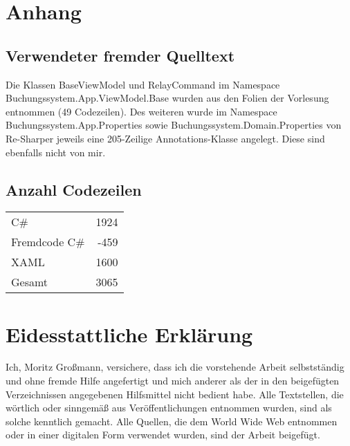 \section{Anhang}

\subsection{Verwendeter fremder Quelltext}

Die Klassen BaseViewModel und RelayCommand im Namespace Buchungssystem.App.ViewModel.Base wurden aus den Folien der Vorlesung entnommen (49 Codezeilen).
Des weiteren wurde im Namespace Buchungssystem.App.Properties sowie Buchungssystem.Domain.Properties von Re-Sharper jeweils eine 205-Zeilige Annotations-Klasse angelegt. 
Diese sind ebenfalls nicht von mir. 

\subsection{Anzahl Codezeilen}

\begin{tabular} {lr}
    C\# & 1924 \\
    Fremdcode C\# & -459 \\
    XAML & 1600 \\
    Gesamt & 3065 \\
\end{tabular}

\section{Eidesstattliche Erklärung}

Ich, Moritz Großmann, versichere, dass ich die vorstehende Arbeit selbstständig und ohne fremde Hilfe angefertigt und mich anderer als der in den beigefügten Verzeichnissen angegebenen Hilfsmittel nicht bedient habe. Alle Textstellen, die wörtlich oder sinngemäß aus Veröffentlichungen entnommen wurden, sind als solche kenntlich gemacht. 
Alle Quellen, die dem World Wide Web entnommen oder in einer digitalen Form verwendet wurden, sind der Arbeit beigefügt.